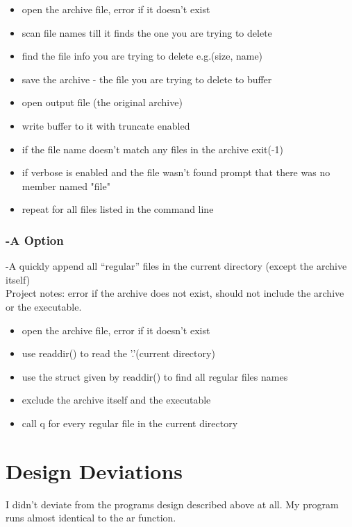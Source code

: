 \documentclass[letterpaper,10pt,notitlepage,fleqn]{article}
\begin{document}
\begin{itemize}
\item open the archive file, error if it doesn't exist
\item scan file names till it finds the one you are trying to delete
\item find the file info you are trying to delete e.g.(size, name)
\item save the archive - the file you are trying to delete to buffer
\item open output file (the original archive)
\item write buffer to it with truncate enabled
\item if the file name doesn't match any files in the archive exit(-1)
\item if verbose is enabled and the file wasn't found prompt that there was no member named "file"
\item repeat for all files listed in the command line
\end{itemize}

    
\subsubsection*{-A     Option}
-A quickly append all ``regular'' files in the current directory (except the archive itself)\\
Project notes: error if the archive does not exist, should not include the archive or the executable.

\begin{itemize}
\item open the archive file, error if it doesn't exist
\item use readdir() to read the '.'(current directory)
\item use the struct given by readdir() to find all regular files names
\item exclude the archive itself and the executable
\item call q for every regular file in the current directory

\end{itemize}

\section*{Design Deviations}
I didn't deviate from the programs design described above at all. My program runs almost identical to the ar function. 
\end{document}
